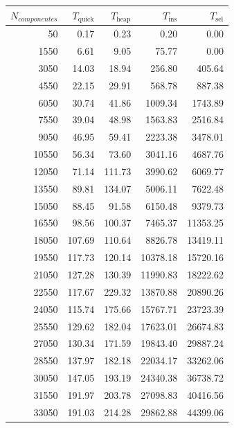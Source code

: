 \documentclass{homework}
\begin{document}
    \begin{table}[H]
        \footnotesize
        \centering
        \begin{tabular}{|r|r|r|r|r|}
            \hline
            $N_{componentes}$ & $T_{\text{quick}}$ & $T_{\text{heap}}$ & $T_{\text{ins}}$ & $T_{\text{sel}}$ \\
            \hline
            50 & 0.17 & 0.23 & 0.20 & 0.00 \\ 
            1550 & 6.61 & 9.05 & 75.77 & 0.00 \\ 
            3050 & 14.03 & 18.94 & 256.80 & 405.64 \\ 
            4550 & 22.15 & 29.91 & 568.78 & 887.38 \\ 
            6050 & 30.74 & 41.86 & 1009.34 & 1743.89 \\ 
            7550 & 39.04 & 48.98 & 1563.83 & 2516.84 \\ 
            9050 & 46.95 & 59.41 & 2223.38 & 3478.01 \\ 
            10550 & 56.34 & 73.60 & 3041.16 & 4687.76 \\ 
            12050 & 71.14 & 111.73 & 3990.62 & 6069.77 \\ 
            13550 & 89.81 & 134.07 & 5006.11 & 7622.48 \\ 
            15050 & 88.45 & 91.58 & 6150.48 & 9379.73 \\ 
            16550 & 98.56 & 100.37 & 7465.37 & 11353.25 \\ 
            18050 & 107.69 & 110.64 & 8826.78 & 13419.11 \\ 
            19550 & 117.73 & 120.14 & 10378.18 & 15720.16 \\ 
            21050 & 127.28 & 130.39 & 11990.83 & 18222.62 \\ 
            22550 & 117.67 & 229.32 & 13870.88 & 20890.26 \\ 
            24050 & 115.74 & 175.66 & 15767.71 & 23723.39 \\ 
            25550 & 129.62 & 182.04 & 17623.01 & 26674.83 \\ 
            27050 & 130.34 & 171.59 & 19843.40 & 29887.24 \\ 
            28550 & 137.97 & 182.18 & 22034.17 & 33262.06 \\ 
            30050 & 147.05 & 193.19 & 24340.38 & 36738.72 \\ 
            31550 & 191.97 & 203.78 & 27098.83 & 40416.56 \\ 
            33050 & 191.03 & 214.28 & 29862.88 & 44399.06 \\ 

\end{tabular}
\end{table}
\end{document}
